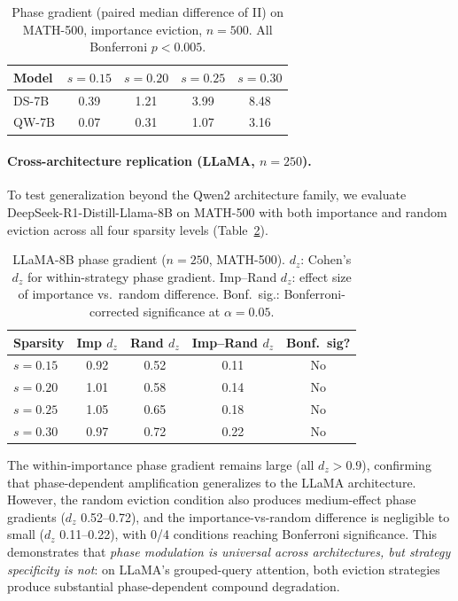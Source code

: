 \documentclass[11pt,a4paper]{article}
\begin{document}
\begin{table}[t]
\centering
\small
\caption{Phase gradient (paired median difference of II) on MATH-500, importance eviction, $n=500$. All Bonferroni $p < 0.005$.}
\label{tab:primary}
\begin{tabular}{lcccc}
\toprule
Model & $s{=}0.15$ & $s{=}0.20$ & $s{=}0.25$ & $s{=}0.30$ \\
\midrule
DS-7B & 0.39 & 1.21 & 3.99 & 8.48 \\
QW-7B & 0.07 & 0.31 & 1.07 & 3.16 \\
\bottomrule
\end{tabular}
\end{table}

\paragraph{Cross-architecture replication (LLaMA, $n=250$).}

To test generalization beyond the Qwen2 architecture family, we evaluate DeepSeek-R1-Distill-Llama-8B on MATH-500 with both importance and random eviction across all four sparsity levels (Table~\ref{tab:llama}).

\begin{table}[t]
\centering
\small
\caption{LLaMA-8B phase gradient ($n=250$, MATH-500). $d_z$: Cohen's $d_z$ for within-strategy phase gradient. Imp--Rand $d_z$: effect size of importance vs.\ random difference. Bonf.\ sig.: Bonferroni-corrected significance at $\alpha=0.05$.}
\label{tab:llama}
\begin{tabular}{lcccc}
\toprule
Sparsity & Imp $d_z$ & Rand $d_z$ & Imp--Rand $d_z$ & Bonf.\ sig? \\
\midrule
$s{=}0.15$ & 0.92 & 0.52 & 0.11 & No \\
$s{=}0.20$ & 1.01 & 0.58 & 0.14 & No \\
$s{=}0.25$ & 1.05 & 0.65 & 0.18 & No \\
$s{=}0.30$ & 0.97 & 0.72 & 0.22 & No \\
\bottomrule
\end{tabular}
\end{table}

The within-importance phase gradient remains large (all $d_z > 0.9$), confirming that phase-dependent amplification generalizes to the LLaMA architecture. However, the random eviction condition also produces medium-effect phase gradients ($d_z$ 0.52--0.72), and the importance-vs-random difference is negligible to small ($d_z$ 0.11--0.22), with 0/4 conditions reaching Bonferroni significance. This demonstrates that \emph{phase modulation is universal across architectures, but strategy specificity is not}: on LLaMA's grouped-query attention, both eviction strategies produce substantial phase-dependent compound degradation.
\end{document}
